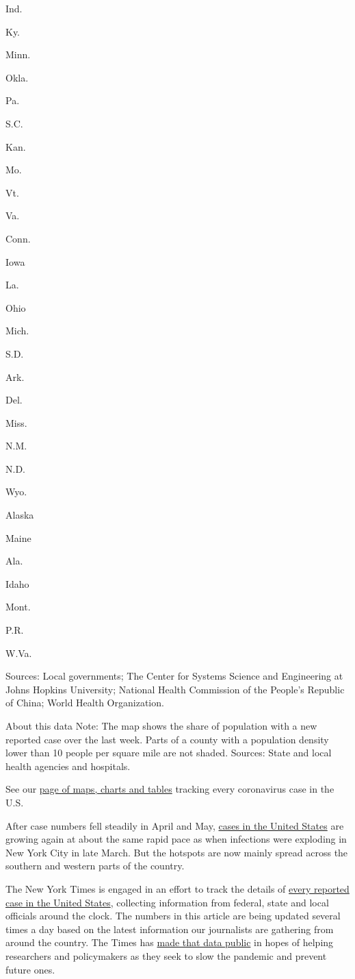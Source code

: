 Ind.

Ky.

Minn.

Okla.

Pa.

S.C.

Kan.

Mo.

Vt.

Va.

Conn.

Iowa

La.

Ohio

Mich.

S.D.

Ark.

Del.

Miss.

N.M.

N.D.

Wyo.

Alaska

Maine

Ala.

Idaho

Mont.

P.R.

W.Va.

Sources: Local governments; The Center for Systems Science and
Engineering at Johns Hopkins University; National Health Commission of
the People's Republic of China; World Health Organization.

About this data Note: The map shows the share of population with a new
reported case over the last week. Parts of a county with a population
density lower than 10 people per square mile are not shaded. Sources:
State and local health agencies and hospitals.

See our
\href{https://www.nytimes3xbfgragh.onion/interactive/2020/us/coronavirus-us-cases.html}{page
of maps, charts and tables} tracking every coronavirus case in the U.S.

After case numbers fell steadily in April and May,
\href{https://www.nytimes3xbfgragh.onion/interactive/2020/us/coronavirus-us-cases.html}{cases
in the United States} are growing again at about the same rapid pace as
when infections were exploding in New York City in late March. But the
hotspots are now mainly spread across the southern and western parts of
the country.

The New York Times is engaged in an effort to track the details of
\href{https://www.nytimes3xbfgragh.onion/interactive/2020/us/coronavirus-us-cases.html}{every
reported case in the United States}, collecting information from
federal, state and local officials around the clock. The numbers in this
article are being updated several times a day based on the latest
information our journalists are gathering from around the country. The
Times has
\href{https://www.nytimes3xbfgragh.onion/article/coronavirus-county-data-us.html?action=click\&module=Spotlight\&pgtype=Homepage}{made
that data public} in hopes of helping researchers and policymakers as
they seek to slow the pandemic and prevent future ones.

